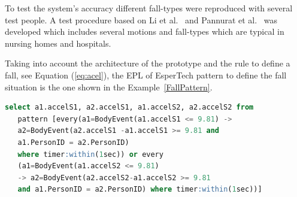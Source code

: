 \documentclass[journal]{IEEEtran}
\begin{document}
% 
% 

To test the system's accuracy different fall-types were reproduced with several test people. A 
test procedure based on Li et al.~\cite{Li2009} and Pannurat et al.~\cite{Pannurat2014} was developed which includes 
several motions and fall-types which are typical in nursing homes and hospitals.

Taking into account the architecture of the prototype and the rule to define a fall, see Equation (\ref{eq:acel}), 
the EPL of EsperTech pattern to define the fall situation is the one shown in the Example~\ref{FallPattern}.

\begin{lstlisting}[basicstyle=\ttfamily\scriptsize,language=SQL,caption=Fall pattern,label=FallPattern]
  select a1.accelS1, a2.accelS1, a1.accelS2, a2.accelS2 from 
   pattern [every(a1=BodyEvent(a1.accelS1 <= 9.81) -> 
   a2=BodyEvent(a2.accelS1 -a1.accelS1 >= 9.81 and 
   a1.PersonID = a2.PersonID) 
   where timer:within(1sec)) or every 
   (a1=BodyEvent(a1.accelS2 <= 9.81)
   -> a2=BodyEvent(a2.accelS2-a1.accelS2 >= 9.81
   and a1.PersonID = a2.PersonID) where timer:within(1sec))]
 \end{lstlisting}
\end{document}
